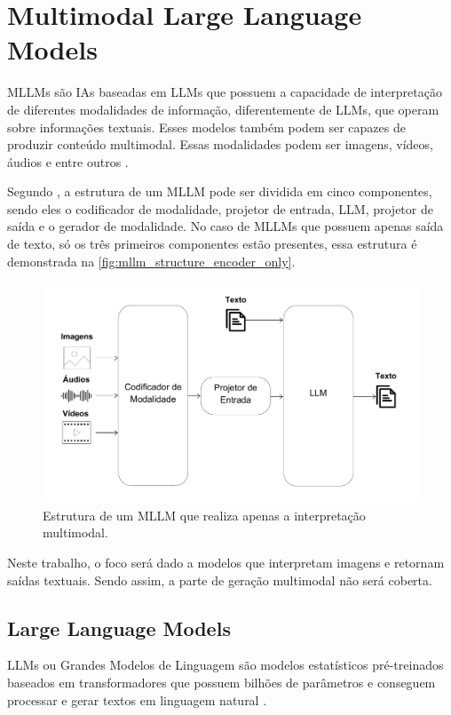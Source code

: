 \section{Multimodal Large Language Models}

\acp{MLLM} são \acp{IA} baseadas em \acp{LLM} que possuem a capacidade de interpretação de diferentes modalidades de informação, diferentemente de \acp{LLM}, que
operam sobre informações textuais. Esses modelos também podem ser capazes de produzir conteúdo multimodal. Essas modalidades podem ser imagens, vídeos, áudios e
entre outros \cite{mllm_survey_2023, mllm_survey_2024}.

Segundo \textcite{mllm_survey_2024}, a estrutura de um \ac{MLLM} pode ser dividida em cinco componentes, sendo eles o codificador de modalidade, projetor de entrada,
\ac{LLM}, projetor de saída e o gerador de modalidade. No caso de \acp{MLLM} que possuem apenas saída de texto, só os três primeiros componentes estão presentes,
essa estrutura é demonstrada na \autoref{fig:mllm_structure_encoder_only}.

\begin{figure}[ht]
      \centering
      \includegraphics[width=0.7\columnwidth,keepaspectratio]{images/mllm_structure_encoder_only.pdf}
      \caption{\small Estrutura de um \ac{MLLM} que realiza apenas a interpretação multimodal.}
      \label{fig:mllm_structure_encoder_only}
\end{figure}

Neste trabalho, o foco será dado a modelos que interpretam imagens e retornam saídas textuais. Sendo assim, a parte de geração multimodal não será coberta.

\subsection{Large Language Models}

\acp{LLM} ou Grandes Modelos de Linguagem são modelos estatísticos pré-treinados baseados em transformadores que possuem bilhões de parâmetros e conseguem processar e
gerar textos em linguagem natural \cite{llm_survey_2024}.

